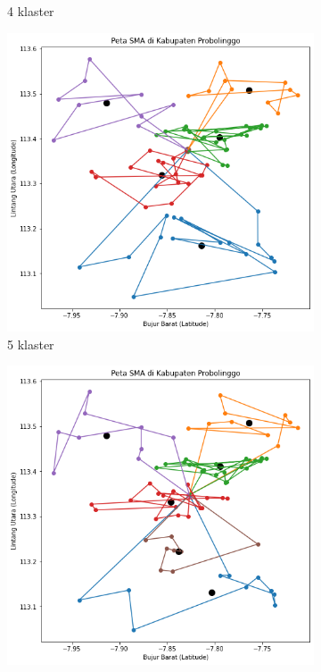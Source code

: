 \begin{figure}[H]
\begin{subfigure}[b]{0.3\textwidth}
		\caption{4 klaster}
		\label{fig:klasterbeda4}	
	\end{subfigure}
	\hfill
	\begin{subfigure}[b]{0.3\textwidth}
		\includegraphics[width=\textwidth]{Gambar/hasil_mtsp/5.png}
		\caption{5 klaster}	
		\label{fig:klasterbeda5}
	\end{subfigure}
	\hfill
	\begin{subfigure}[b]{0.3\textwidth}
		\includegraphics[width=\textwidth]{Gambar/hasil_mtsp/6.png}

\end{subfigure}
\end{figure}
